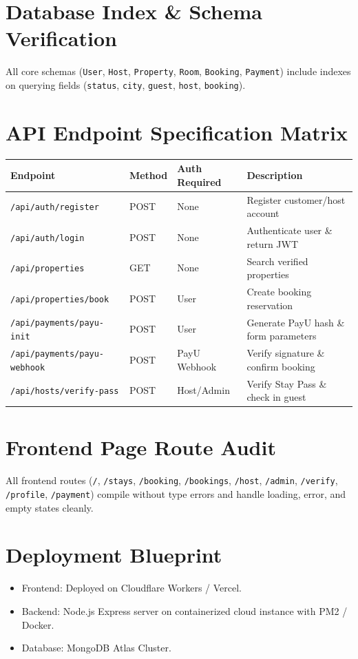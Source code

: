 \documentclass[11pt,a4paper]{article}
\begin{document}
\section{Database Index \& Schema Verification}
All core schemas (\texttt{User}, \texttt{Host}, \texttt{Property}, \texttt{Room}, \texttt{Booking}, \texttt{Payment}) include indexes on querying fields (\texttt{status}, \texttt{city}, \texttt{guest}, \texttt{host}, \texttt{booking}).

\section{API Endpoint Specification Matrix}
\begin{longtable}{@{}llll@{}}
\toprule
\textbf{Endpoint} & \textbf{Method} & \textbf{Auth Required} & \textbf{Description} \\ \midrule
\texttt{/api/auth/register} & POST & None & Register customer/host account \\
\texttt{/api/auth/login} & POST & None & Authenticate user \& return JWT \\
\texttt{/api/properties} & GET & None & Search verified properties \\
\texttt{/api/properties/book} & POST & User & Create booking reservation \\
\texttt{/api/payments/payu-init} & POST & User & Generate PayU hash \& form parameters \\
\texttt{/api/payments/payu-webhook}& POST & PayU Webhook & Verify signature \& confirm booking \\
\texttt{/api/hosts/verify-pass} & POST & Host/Admin & Verify Stay Pass \& check in guest \\ \bottomrule
\end{longtable}

\section{Frontend Page Route Audit}
All frontend routes (\texttt{/}, \texttt{/stays}, \texttt{/booking}, \texttt{/bookings}, \texttt{/host}, \texttt{/admin}, \texttt{/verify}, \texttt{/profile}, \texttt{/payment}) compile without type errors and handle loading, error, and empty states cleanly.

\section{Deployment Blueprint}
\begin{itemize}
    \item Frontend: Deployed on Cloudflare Workers / Vercel.
    \item Backend: Node.js Express server on containerized cloud instance with PM2 / Docker.
    \item Database: MongoDB Atlas Cluster.
\end{itemize}
\end{document}
